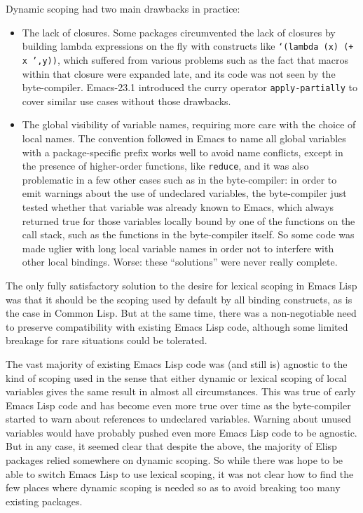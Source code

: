 \documentclass[format=acmsmall, review]{acmart}
\newcommand \Elisp {Emacs Lisp}
\begin{document}
Dynamic scoping had two main drawbacks in practice:
\begin{itemize}
\item The lack of closures.  Some packages circumvented the lack of closures
  by building lambda expressions on the fly with constructs like
  \texttt{`(lambda (x) (+ x ',y))}, which suffered from various problems
  such as the fact that macros within that closure were expanded late, and
  its code was not seen by the byte-compiler.  Emacs-23.1 introduced the
  curry operator \texttt{apply-partially} to cover similar use cases without
  those drawbacks.
\item The global visibility of variable names, requiring more care with the
  choice of local names.  The convention followed in Emacs to name all
  global variables with a package-specific prefix works well to avoid name
  conflicts, except in the presence of higher-order functions, like
  \texttt{reduce}, and it was also problematic in a few other cases such as
  in the byte-compiler: in order to emit warnings about the use of
  undeclared variables, the byte-compiler just tested whether that variable
  was already known to Emacs, which always returned true for those variables
  locally bound by one of the functions on the call stack, such as the
  functions in the byte-compiler itself.  So some code was made uglier with
  long local variable names in order not to interfere with other local
  bindings.  Worse: these ``solutions'' were never really complete.
\end{itemize}
The only fully satisfactory solution to the desire for lexical scoping in
\Elisp{} was that it should be the scoping used by default by all binding
constructs, as is the case in Common Lisp.  But at the same time, there was
a non-negotiable need to preserve compatibility with existing \Elisp{} code,
although some limited breakage for rare situations could be tolerated.

The vast majority of existing \Elisp{} code was (and still is) agnostic to
the kind of scoping used in the sense that either dynamic or lexical scoping
of local variables gives the same result in almost all circumstances.  This was true of early
\Elisp{} code and has become even more true over time as the byte-compiler
started to warn about references to undeclared variables.  Warning about
unused variables would have probably pushed even more \Elisp{} code to be
agnostic.  But in any case, it seemed clear that despite the above, the
majority of Elisp packages relied somewhere on dynamic scoping.  So while
there was hope to be able to switch \Elisp{} to use lexical scoping, it was
not clear how to find the few places where dynamic scoping is needed so as
to avoid breaking too many existing packages.
\end{document}
